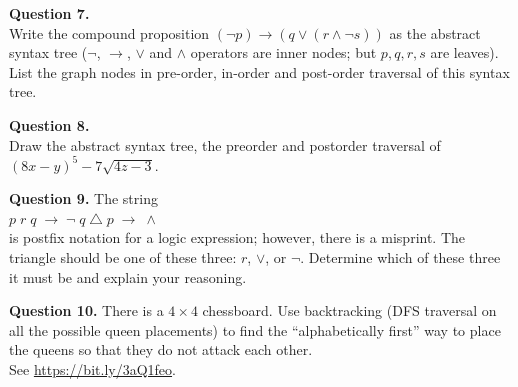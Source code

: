 \documentclass[jou]{apa6}
\begin{document}
\vspace{10pt}
{\bf Question 7.}\\
Write the compound proposition $(\neg p) \rightarrow (q \vee (r \wedge \neg s))$ 
as the abstract syntax tree ($\neg$, $\rightarrow$, $\vee$ and $\wedge$ operators
are inner nodes; but $p,q,r,s$ are leaves).\\
List the graph nodes in pre-order, in-order and post-order traversal of this syntax tree.


\vspace{10pt}
{\bf Question 8.}\\
Draw the abstract syntax tree, the preorder and postorder traversal 
of $(8x - y)^5 - 7\sqrt{4z - 3}$.


\vspace{10pt}
{\bf Question 9.} 
The string\\
$p\;r\;q\;\rightarrow\;\neg\;q\;\triangle\;p\;\rightarrow\;\wedge$\\
is postfix notation for a logic expression; however, there is a misprint. The
triangle should be one of these three: $r$, $\vee$, or $\neg$. 
Determine which of these three it must be and explain your
reasoning.


\vspace{10pt}
{\bf Question 10.} 
There is a $4 \times 4$ chessboard. Use backtracking (DFS traversal on all the possible queen placements) 
to find the ``alphabetically first'' way to place the queens so that they do not attack each other.\\
See \url{https://bit.ly/3aQ1feo}.
\end{document}
